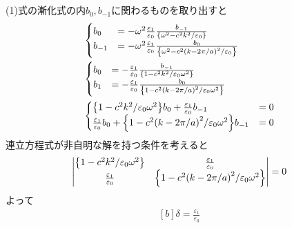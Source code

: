 \documentclass[../ap_2008.tex]{subfiles}
\begin{document}
\section{}
(1)式の漸化式の内\(b_0,b_{-1}\)に関わるものを取り出すと
\begin{equation}\begin{aligned}[b]
    &\begin{cases}
        b_0 &= -\omega^2\frac{\varepsilon_1}{\varepsilon_0}\frac{b_{-1}}{\qty{\omega^2-c^2k^2/\varepsilon_0}}\\
        b_{-1} &= -\omega^2\frac{\varepsilon_1}{\varepsilon_0}\frac{b_{0}}{\qty{\omega^2-c^2\qty(k-2\pi/a)^2/\varepsilon_0}}
    \end{cases}\\
    &\begin{cases}
        b_0 &= -\frac{\varepsilon_1}{\varepsilon_0}\frac{b_{-1}}{\qty{1-c^2k^2/\varepsilon_0\omega^2}}\\
        b_1 &= -\frac{\varepsilon_1}{\varepsilon_0}\frac{b_{0}}{\qty{1-c^2\qty(k-2\pi/a)^2/\varepsilon_0\omega^2}}
    \end{cases}\\
    &\begin{cases}
        \qty{1-c^2k^2/\varepsilon_0\omega^2}b_0 + \frac{\varepsilon_1}{\varepsilon_0}b_{-1}&=0\\
        \frac{\varepsilon_1}{\varepsilon_0}b_{0}+ \qty{1-c^2\qty(k-2\pi/a)^2/\varepsilon_0\omega^2}b_{-1} &= 0
    \end{cases}\\
\end{aligned}\end{equation}
連立方程式が非自明な解を持つ条件を考えると
\begin{equation}\begin{aligned}[b]
    \begin{vmatrix}
        \qty{1-c^2k^2/\varepsilon_0\omega^2}& \frac{\varepsilon_1}{\varepsilon_0}\\
        \frac{\varepsilon_1}{\varepsilon_0} & \qty{1-c^2\qty(k-2\pi/a)^2/\varepsilon_0\omega^2}
    \end{vmatrix}=0
\end{aligned}\end{equation}
よって
\begin{equation}\begin{aligned}[b]
    \delta = \frac{\varepsilon_1}{\varepsilon_0}
\end{aligned}\end{equation}
\end{document}
